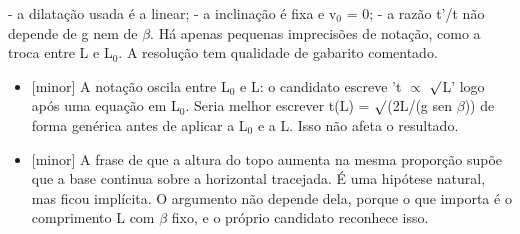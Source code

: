 \documentclass{article}%
\begin{document}
{-} a dilatação usada é a linear;\newline%
{-} a inclinação é fixa e v$_{0}$ = 0;\newline%
{-} a razão t'/t não depende de g nem de $\beta$.\newline%
\newline%
Há apenas pequenas imprecisões de notação, como a troca entre L e L$_{0}$. A resolução tem qualidade de gabarito comentado.%
\begin{itemize}%
\item%
{[}minor{]} A notação oscila entre L$_{0}$ e L: o candidato escreve 't $\propto$ $\surd$L' logo após uma equação em L$_{0}$. Seria melhor escrever t(L) = $\surd$(2L/(g sen $\beta$)) de forma genérica antes de aplicar a L$_{0}$ e a L. Isso não afeta o resultado.%
\item%
{[}minor{]} A frase de que a altura do topo aumenta na mesma proporção supõe que a base continua sobre a horizontal tracejada. É uma hipótese natural, mas ficou implícita. O argumento não depende dela, porque o que importa é o comprimento L com $\beta$ fixo, e o próprio candidato reconhece isso.%
\end{itemize}%
\end{document}
